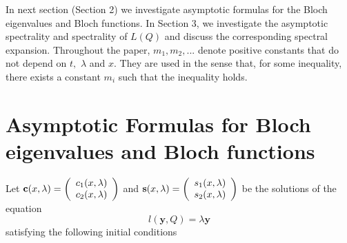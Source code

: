 \documentclass{article}%
\begin{document}
In next section (Section 2) we investigate asymptotic formulas for the Bloch
eigenvalues and Bloch functions. In Section 3, we investigate the asymptotic
spectrality and spectrality of $L(Q)$ and discuss the corresponding spectral
expansion. Throughout the paper, $m_{1},m_{2},...$ denote positive constants
that do not depend on $t,$ $\lambda$ and $x.$ They are used in the sense that,
for some inequality, there exists a constant $m_{i}$ such that the inequality holds.

\section{Asymptotic Formulas for Bloch eigenvalues and Bloch functions}

Let $\mathbf{c}(x,\lambda)=\left(
\begin{array}
[c]{c}%
c_{1}(x,\lambda)\\
c_{2}(x,\lambda)
\end{array}
\right)  $ and $\mathbf{s}(x,\lambda)=\left(
\begin{array}
[c]{c}%
s_{1}(x,\lambda)\\
s_{2}(x,\lambda)
\end{array}
\right)  $ be the solutions of the equation%
\begin{equation}
l(\mathbf{y,}Q)=\lambda\mathbf{y} \tag{8}%
\end{equation}
satisfying the following initial conditions%
\end{document}
